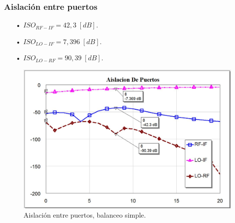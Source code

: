 \documentclass[twocolumn]{article}
\begin{document}
\subsubsection{Aislación entre puertos}
%
\begin{itemize}\itemsep0em
\item[•]  $ISO_{RF-IF} = 42,3 \; [dB]$.
\item[•]  $ISO_{LO-IF} = 7,396 \; [dB]$.
\item[•]  $ISO_{LO-RF} = 90,39 \; [dB]$.
\end{itemize}
%
\begin{figure}[H]
  \centering    
	\includegraphics[scale=0.3]{imagenes/ISO2.jpg}
	\caption{Aislación entre puertos, balanceo simple.}\label{fig:ISO2}
\end{figure}
%
\end{document}
